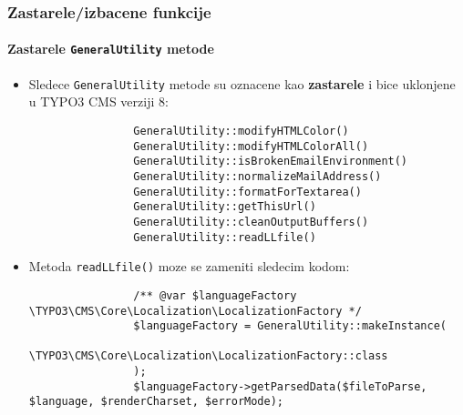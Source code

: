 \begin{frame}[fragile]
	\frametitle{Zastarele/izbacene funkcije}
	\framesubtitle{Zastarele \texttt{GeneralUtility} metode}

	\lstset{basicstyle=\tiny\ttfamily}

	\begin{itemize}
		\item Sledece \texttt{GeneralUtility} metode su oznacene kao \textbf{zastarele}
			i bice uklonjene u TYPO3 CMS verziji 8:

			\begin{lstlisting}
				GeneralUtility::modifyHTMLColor()
				GeneralUtility::modifyHTMLColorAll()
				GeneralUtility::isBrokenEmailEnvironment()
				GeneralUtility::normalizeMailAddress()
				GeneralUtility::formatForTextarea()
				GeneralUtility::getThisUrl()
				GeneralUtility::cleanOutputBuffers()
				GeneralUtility::readLLfile()
			\end{lstlisting}

		\item Metoda \texttt{readLLfile()} moze se zameniti sledecim kodom:

			\begin{lstlisting}
				/** @var $languageFactory \TYPO3\CMS\Core\Localization\LocalizationFactory */
				$languageFactory = GeneralUtility::makeInstance(
				  \TYPO3\CMS\Core\Localization\LocalizationFactory::class
				);
				$languageFactory->getParsedData($fileToParse, $language, $renderCharset, $errorMode);
			\end{lstlisting}

	\end{itemize}

\end{frame}


